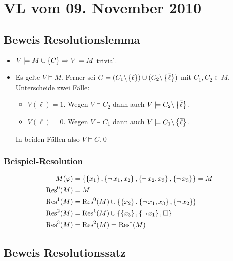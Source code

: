 \section{VL vom 09. November 2010}

\subsection{Beweis Resolutionslemma}

\begin{itemize}
  \item $V \models  M \cup \left\{C\right\} \Rightarrow V \models  M$ trivial.
  \item Es gelte $V\models M$. Ferner sei $C=(C_1\backslash \left\{\ell\right\}) \cup
  (C_2\backslash \left\{\overline{\ell}\right\})$ mit $C_1,C_2 \in M$. Unterscheide zwei
  Fälle:
  \begin{itemize}
    \item $V(\ell) = 1$. Wegen $V\models C_2$ dann auch $V\models C_2\backslash \left\{\overline{\ell}\right\}$.
    \item $V(\ell) = 0$. Wegen $V\models C_1$ dann auch $V\models C_1\backslash \left\{\overline{\ell}\right\}$.
  \end{itemize}
  In beiden Fällen also $V\models C$.\qed
\end{itemize}

\subsubsection{Beispiel-Resolution}

\begin{align}
  M(\varphi) &= \left\{\left\{x_1\right\}, \left\{\operatorname{\neg} x_1, x_2\right\}, \left\{\operatorname{\neg} x_2, x_3\right\}, \left\{\operatorname{\neg} x_3\right\}\right\} = M \\
  \operatorname{\text{Res}}^0(M)   &= M \\
  \operatorname{\text{Res}}^1(M)   &= \operatorname{\text{Res}}^0(M) \cup \left\{\left\{x_2\right\}, \left\{\operatorname{\neg} x_1, x_3\right\}, \left\{\operatorname{\neg} x_2\right\}\right\} \\
  \operatorname{\text{Res}}^2(M)   &= \operatorname{\text{Res}}^1(M) \cup \left\{\left\{x_3\right\}, \left\{\operatorname{\neg} x_1\right\}, \square\right\} \\
  \operatorname{\text{Res}}^3(M)   &= \operatorname{\text{Res}}^2(M) = \operatorname{\text{Res}}^*(M)
\end{align}

\subsection{Beweis Resolutionssatz}


